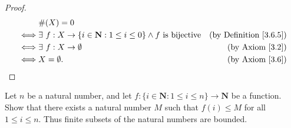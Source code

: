 \begin{proof}
    \begin{align*}
             & \#(X) = 0                                                                                                                   \\
        \iff & \exists\ f : X \to \{i \in \mathbf{N} : 1 \leq i \leq 0\} \land f \text{ is bijective} & \text{(by Definition \ref{3.6.5})} \\
        \iff & \exists\ f : X \to \emptyset                                                           & \text{(by Axiom \ref{3.2})}        \\
        \iff & X = \emptyset.                                                                         & \text{(by Axiom \ref{3.6})}
    \end{align*}
\end{proof}

\begin{exercise}\label{ex 3.6.3}
    Let \(n\) be a natural number, and let \(f : \{i \in \mathbf{N} : 1 \leq i \leq n\} \to \mathbf{N}\) be a function.
    Show that there exists a natural number \(M\) such that \(f(i) \leq M\) for all \(1 \leq i \leq n\).
    Thus finite subsets of the natural numbers are bounded.
\end{exercise}

